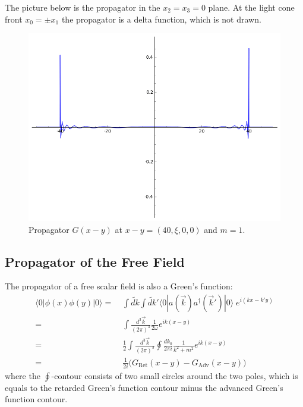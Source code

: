 \documentclass[12pt]{article}
\begin{document}
The picture below is the propagator in the $x_2=x_3=0$ plane. At the
light cone front $x_0 = \pm x_1$ the propagator is a delta function,
which is not drawn.
\begin{figure}
  \centering
  \includegraphics[width=\linewidth]{figures/propagator.png}
  \caption{Propagator $G(x-y)$ at $x-y = (40, \xi, 0, 0)$ and $m=1$.}
\end{figure}


\subsection{Propagator of the Free Field}

The propagator of a free scalar field is also a Green's function:
\begin{equation}
  \begin{split}
    \langle 0| \phi(x) \phi(y) |0\rangle =&\;
    \int \widetilde{dk} \int \widetilde{dk}' 
    \langle 0| a(\vec{k}) a^\dagger(\vec{k}') |0\rangle \; e^{i(kx-k'y)}
    \\    =&\;
    \int \frac{d^3\vec{k}}{(2\pi)^3}
    \frac{1}{2\omega} 
    e^{ik(x-y)}
    \\    =&\;
    \frac{1}{2} 
    \int \frac{d^3\vec{k}}{(2\pi)^3}
    \oint \frac{dk_0}{2\pi i}
    \frac{1}{k^2+m^2} 
    e^{ik(x-y)}
    \\    =&\;
    \frac{1}{2i} \Big(
    G_\text{Ret}(x-y) - G_\text{Adv}(x-y)
    \Big)
  \end{split}
\end{equation}
where the $\oint$-contour consists of two small circles around the two
poles, which is equals to the retarded Green's function contour minus
the advanced Green's function contour.
\end{document}
